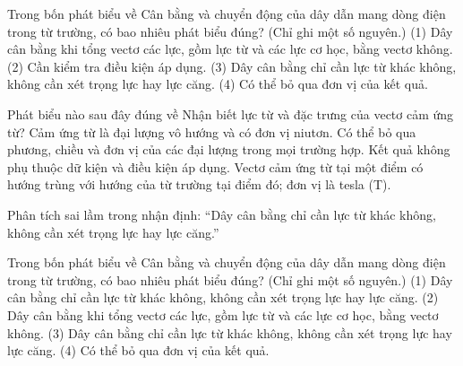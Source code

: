 \begin{ex}
Trong bốn phát biểu về Cân bằng và chuyển động của dây dẫn mang dòng điện trong từ trường, có bao nhiêu phát biểu đúng? (Chỉ ghi một số nguyên.) (1) Dây cân bằng khi tổng vectơ các lực, gồm lực từ và các lực cơ học, bằng vectơ không. (2) Cần kiểm tra điều kiện áp dụng. (3) Dây cân bằng chỉ cần lực từ khác không, không cần xét trọng lực hay lực căng. (4) Có thể bỏ qua đơn vị của kết quả.
\end{ex}

\begin{ex}
Phát biểu nào sau đây đúng về Nhận biết lực từ và đặc trưng của vectơ cảm ứng từ?
\choice
{Cảm ứng từ là đại lượng vô hướng và có đơn vị niutơn.}
{Có thể bỏ qua phương, chiều và đơn vị của các đại lượng trong mọi trường hợp.}
{Kết quả không phụ thuộc dữ kiện và điều kiện áp dụng.}
{\True Vectơ cảm ứng từ tại một điểm có hướng trùng với hướng của từ trường tại điểm đó; đơn vị là tesla (T).}
\end{ex}

\begin{bt}
Phân tích sai lầm trong nhận định: “Dây cân bằng chỉ cần lực từ khác không, không cần xét trọng lực hay lực căng.”
\end{bt}

\begin{ex}
Trong bốn phát biểu về Cân bằng và chuyển động của dây dẫn mang dòng điện trong từ trường, có bao nhiêu phát biểu đúng? (Chỉ ghi một số nguyên.) (1) Dây cân bằng chỉ cần lực từ khác không, không cần xét trọng lực hay lực căng. (2) Dây cân bằng khi tổng vectơ các lực, gồm lực từ và các lực cơ học, bằng vectơ không. (3) Dây cân bằng chỉ cần lực từ khác không, không cần xét trọng lực hay lực căng. (4) Có thể bỏ qua đơn vị của kết quả.
\end{ex}

